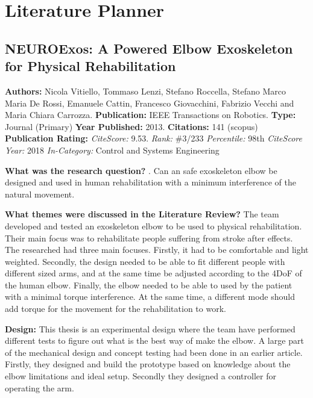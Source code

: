 

\chapter{Literature Planner}
\section{NEUROExos: A Powered Elbow Exoskeleton for Physical Rehabilitation}
\textbf{Authors:} Nicola Vitiello, Tommaso Lenzi, Stefano Roccella, Stefano Marco Maria De Rossi, Emanuele Cattin, Francesco Giovacchini, Fabrizio Vecchi and Maria Chiara Carrozza. \newline
\textbf{Publication:} IEEE Transactions on Robotics.  
\textbf{Type:} Journal (Primary) \newline
\textbf{Year Published:}  2013.   
\textbf{Citations:} 141 (scopus) \newline 
\textbf{Publication Rating:}    
\textit{CiteScore:} 9.53. \textit{Rank:} \#3/233 \textit{Percentile:} 98th \newline
\textit{CiteScore Year:} 2018
\textit{In-Category:} Control and Systems Engineering

\textbf{What was the research question?} . 
Can an safe exoskeleton elbow be designed and used in human rehabilitation with a minimum interference of the natural movement. 

\textbf{What themes were discussed in the Literature Review?} 
The team developed and tested an exoskeleton elbow to be used to physical rehabilitation. Their main focus was to rehabilitate people suffering from stroke after effects. The researched had three main focuses. Firstly, it had to be comfortable  and light weighted. Secondly, the design needed to be able to fit different people with different sized arms, and at the same time be adjusted according to the 4DoF of the human elbow. Finally, the elbow needed to be able to used by the patient with a minimal torque interference. At the same time, a different mode should add torque for the movement for the rehabilitation to work. 

\textbf{Design:}  
This thesis is an experimental design where the team have performed different tests to figure out what is the best way of make the elbow. A large part of the mechanical design and concept testing had been done in an earlier article. Firstly, they designed and build the prototype based on knowledge about the elbow limitations and ideal setup. Secondly they designed a controller for operating the arm. 

